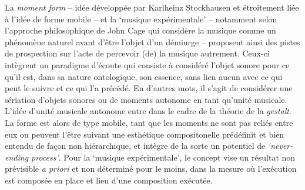 \documentclass{article}
\begin{document}
La \textsl{moment form} -- idée développée par Karlheinz Stockhausen et étroitement liée à l'idée de forme mobile  -- et la `musique expérimentale' -- notamment selon l'approche philosophique de John Cage qui considère la musique comme un phénomène naturel avant d'être l'objet d'un démiurge -- proposent ainsi des pistes de prospection sur l'acte de percevoir (de) la musique autrement. Ceux-ci intègrent un paradigme d'écoute qui consiste à considéré l'objet sonore pour ce qu'il est, dans sa nature ontologique, son essence, sans lien aucun %
avec ce qui peut le suivre et ce qui l'a précédé. 
En d'autres mots, il s'agit de considérer une sériation d'objets sonores ou de moments %
autonome en tant qu'unité musicale. %
L'idée d'unité musicale autonome entre dans le cadre de la théorie de la \textit{gestalt}\label{efn:gestalt}. %
La forme est alors de type mobile, tant que les moments ne sont pas reliés entre eux ou peuvent l'être suivant une esthétique compositonelle prédéfinit et bien entendu de façon non hiérarchique, et intègre de la sorte un potentiel de \textsl{`never-ending process'}.
Pour la `musique expérimentale', le concept vise un résultat non prévisible \textit{a priori} et non déterminé pour le moins, dans la mesure où l'exécution est composée en place et lieu d'une composition exécutée. %
\end{document}
